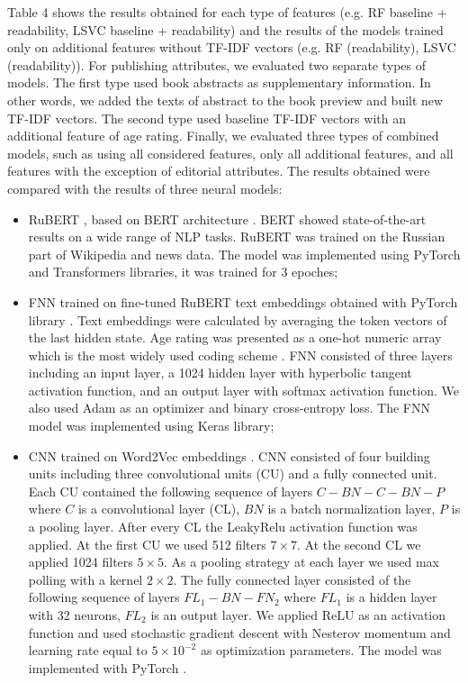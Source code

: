 \documentclass[runningheads]{llncs}
\begin{document}
Table 4 shows the results obtained for each type of features (e.g. RF baseline + readability, LSVC baseline + readability) and the results of the models trained only on additional features without TF-IDF vectors (e.g. RF (readability), LSVC (readability)). For publishing attributes, we evaluated two separate types of models. The first type used book abstracts as supplementary information. In other words, we added the texts of abstract to the book preview and built new TF-IDF vectors. The second type used baseline TF-IDF vectors with an additional feature of age rating. Finally, we evaluated three types of combined models, such as using all considered features, only all additional features, and all features with the exception of editorial attributes. The results obtained were compared with the results of three neural models:
\begin{itemize}
    \item RuBERT \cite{Kuratov}, based on BERT architecture \cite{Devlin}. BERT showed state-of-the-art results on a wide range of NLP tasks. RuBERT was trained on the Russian part of Wikipedia and news data. The model was implemented using PyTorch \cite{Paszke} and Transformers \cite{Wolf} libraries, it was trained for 3 epoches;
    \item FNN trained on fine-tuned RuBERT \cite{Kuratov} text embeddings obtained with PyTorch library \cite{Paszke}. Text embeddings were calculated by averaging the token vectors of the last hidden state. Age rating was presented as a one-hot numeric array which is the most widely used coding scheme \cite{coding}. FNN consisted of three layers including an input layer, a 1024 hidden layer with hyperbolic tangent activation function, and an output layer with softmax activation function. We also used Adam as an optimizer and binary cross-entropy loss. The FNN model was implemented using Keras \cite{Keras} library;
    \item CNN trained on Word2Vec embeddings \cite{Kutuzov}. CNN consisted of four building units including three convolutional units (CU) and a fully connected unit. Each CU contained the following sequence of layers $C-BN-C-BN-P$ where $C$ is a convolutional layer (CL), $BN$ is a batch normalization layer, $P$ is a pooling layer. After every CL the LeakyRelu activation function was applied. At the first CU we used 512 filters $7\times7$. At the second CL we applied 1024 filters $5\times5$. As a pooling strategy at each layer we used max polling with a kernel $2\times2$. The fully connected layer consisted of the following sequence of layers $FL_1-BN-FN_2$ where $FL_1$ is a hidden layer with 32 neurons, $FL_2$ is an output layer. We applied ReLU as an activation function and used stochastic gradient descent with Nesterov momentum and learning rate equal to $5\times10^{-2}$ as optimization parameters. The model was implemented with PyTorch \cite{Paszke}.
\end{itemize}
\end{document}
